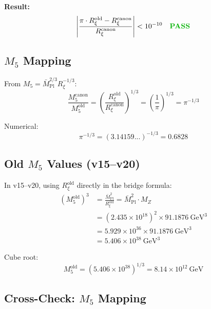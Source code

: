 \documentclass[11pt,a4paper]{article}
\newcommand{\Rxi}{R_\xi}
\newcommand{\Mplbar}{\bar{M}_{\mathrm{Pl}}}
\newcommand{\Mfive}{M_5}
\newcommand{\MZ}{M_Z}
\newcommand{\PASS}{\textcolor{green!70!black}{\textbf{PASS}}}
\begin{document}
\textbf{Result:}
\begin{equation}
\left| \frac{\pi \cdot \Rxi^{\mathrm{old}} - \Rxi^{\mathrm{canon}}}{\Rxi^{\mathrm{canon}}} \right|
< 10^{-10} \quad \PASS
\label{eq:pi-map-Rxi-pass}
\end{equation}

\subsection{$\Mfive$ Mapping}

From $\Mfive = \Mplbar^{2/3} \Rxi^{-1/3}$:
\begin{equation}
\frac{\Mfive^{\mathrm{canon}}}{\Mfive^{\mathrm{old}}} =
\left(\frac{\Rxi^{\mathrm{old}}}{\Rxi^{\mathrm{canon}}}\right)^{1/3} =
\left(\frac{1}{\pi}\right)^{1/3} = \pi^{-1/3}
\label{eq:M5-pi-map}
\end{equation}

Numerical:
\begin{equation}
\pi^{-1/3} = (3.14159...)^{-1/3} = 0.6828
\label{eq:pi-minus-third-value}
\end{equation}

\subsection{Old $\Mfive$ Values (v15--v20)}

In v15--v20, using $\Rxi^{\mathrm{old}}$ directly in the bridge formula:
\begin{align}
(\Mfive^{\mathrm{old}})^3 &= \frac{\Mplbar^2}{\Rxi^{\mathrm{old}}}
= \Mplbar^2 \cdot \MZ \label{eq:M5-old-cubed}\\
&= (2.435 \times 10^{18})^2 \times 91.1876~\mathrm{GeV}^3 \label{eq:M5-old-step1}\\
&= 5.929 \times 10^{36} \times 91.1876~\mathrm{GeV}^3 \label{eq:M5-old-step2}\\
&= 5.406 \times 10^{38}~\mathrm{GeV}^3 \label{eq:M5-old-step3}
\end{align}

Cube root:
\begin{equation}
\Mfive^{\mathrm{old}} = (5.406 \times 10^{38})^{1/3} = 8.14 \times 10^{12}~\mathrm{GeV}
\label{eq:M5-old-result}
\end{equation}

\subsection{Cross-Check: $\Mfive$ Mapping}
\end{document}
